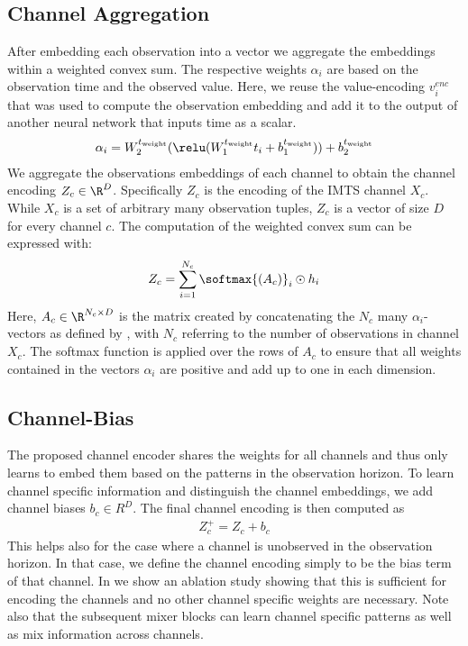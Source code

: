 \subsection{Channel Aggregation}
After embedding each observation into a vector we aggregate the embeddings within a weighted convex sum.
The respective weights $\alpha_i$ are based on the observation time and the observed value. 
Here, we reuse the value-encoding $v^{enc}_i$ that was used to compute the observation embedding and add it to the output of another
neural network that inputs time as a scalar.
\begin{align}\label{eq:weight}
    \alpha_i = W_2^{t_\text{weight}}(\relu(W_1^{t_\text{weight}}t_i + b^{t_\text{weight}}_1)) + b^{t_\text{weight}}_2
\end{align}
We aggregate the observations embeddings of each channel to obtain the channel encoding $Z_c \in \R^D$. Specifically $Z_c$ is the encoding
of the IMTS channel $X_c$. While $X_c$ is a set of arbitrary many observation tuples, $Z_c$ is a vector of size $D$ for every channel $c$.
The computation of the weighted convex sum can be expressed with:   
\begin{align}\label{eq:agg}
    Z_c = \sum^{N_c}_{i=1} \softmax{(A_c)}_i \odot h_i
\end{align}
Here, $A_c \in \R^{N_c \times D}$ is the matrix created by concatenating the $N_c$ many $\alpha_i$-vectors as defined by ,
with $N_c$ referring to the number of observations in channel $X_c$. The softmax function is applied 
over the rows of $A_c$ to ensure that all weights contained in the vectors $\alpha_i$ are positive and add up to one in each dimension.    

\subsection{Channel-Bias}
The proposed channel encoder shares the weights for all channels and thus only learns to embed them based on the patterns in the observation horizon. 
To learn channel specific information and distinguish the channel embeddings, we add channel biases $b_c \in R^D$. 
The final channel encoding is then computed as
\begin{align}\label{eq:bias}
    Z_c^+ = Z_c + b_c
\end{align}
This helps also for the case where a channel is unobserved in the observation horizon.
In that case, we define the channel encoding simply to be the bias term of that channel. 
In  we show an ablation study showing that this is sufficient for encoding the channels and no other channel specific weights are necessary.
Note also that the subsequent mixer blocks can learn channel specific patterns as well as mix information across channels.

